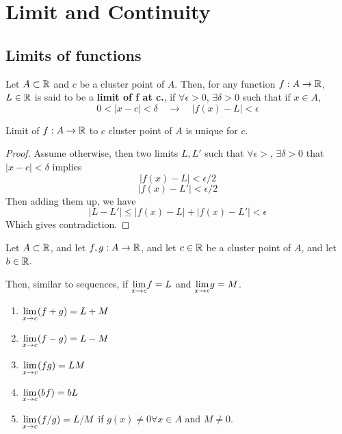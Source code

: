 \chapter{Limit and Continuity}
\section{Limits of functions}
\begin{definition} Let $A \subset {\mathbb{R}}$ and $c$ be a cluster point of $A$. Then, for any function $f: A \to {\mathbb{R}}$, $L \in {\mathbb{R}}$ is said to be a \textbf{limit of f at c.}, if $\forall \epsilon > 0$, $\exists \delta > 0$ such that if $x \in A$,
    \[ 0 < |x-c| < \delta \quad \rightarrow \quad |f(x)- L| < \epsilon \]
\end{definition}

\begin{theorem} Limit of $f: A \to {\mathbb{R}}$ to $c$ cluster point of $A$ is unique for $c$.
    \begin{proof}
        Assume otherwise, then two limits $L, L'$ such that $\forall \epsilon >$, $\exists \delta > 0$ that $|x-c| < \delta$ implies
        \[ |f(x) - L| < \epsilon/2\]
        \[ |f(x) - L'| < \epsilon /2\]
        Then adding them up, we have
        \[ | L - L'| \le |f(x) -L| + |f(x) - L'| < \epsilon\]
        Which gives contradiction.
    \end{proof}
\end{theorem}
\begin{theorem}
    Let $A \subset {\mathbb{R}}$, and let $f,g: A \to {\mathbb{R}}$, and let $c \in {\mathbb{R}}$ be a cluster point of $A$, and let $b \in {\mathbb{R}}$.
    
    Then, similar to sequences, if $\underset{x \to c}{\lim}f = L$ and $\underset{x \to c}{\lim}g = M$.
    \begin{enumerate}
        \item $\underset{x \to c}{\lim} (f+g) = L + M$
        \item $\underset{x \to c}{\lim} (f-g) = L - M$ 
        \item $\underset{x \to c}{\lim} (fg) = LM$ 
        \item $\underset{x \to c}{\lim} (bf) = bL$
        \item $\underset{x \to c}{\lim} (f/g) = L/M$ if $g(x) \neq 0  \forall x \in A$ and $M \neq 0$.

    \end{enumerate}
\end{theorem}



